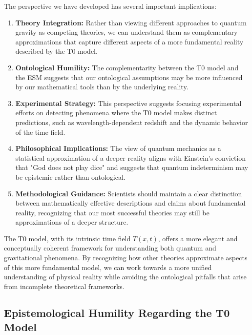 \documentclass[12pt,a4paper]{article}
\newcommand{\Tfieldt}{T(x,t)}
\begin{document}
	The perspective we have developed has several important implications:
	
	\begin{enumerate}
		\item \textbf{Theory Integration:} Rather than viewing different approaches to quantum gravity as competing theories, we can understand them as complementary approximations that capture different aspects of a more fundamental reality described by the T0 model.
		
		\item \textbf{Ontological Humility:} The complementarity between the T0 model and the ESM suggests that our ontological assumptions may be more influenced by our mathematical tools than by the underlying reality.
		
		\item \textbf{Experimental Strategy:} This perspective suggests focusing experimental efforts on detecting phenomena where the T0 model makes distinct predictions, such as wavelength-dependent redshift and the dynamic behavior of the time field.
		
		\item \textbf{Philosophical Implications:} The view of quantum mechanics as a statistical approximation of a deeper reality aligns with Einstein's conviction that "God does not play dice" and suggests that quantum indeterminism may be epistemic rather than ontological.
		
		\item \textbf{Methodological Guidance:} Scientists should maintain a clear distinction between mathematically effective descriptions and claims about fundamental reality, recognizing that our most successful theories may still be approximations of a deeper structure.
	\end{enumerate}
	
	The T0 model, with its intrinsic time field $\Tfieldt$, offers a more elegant and conceptually coherent framework for understanding both quantum and gravitational phenomena. By recognizing how other theories approximate aspects of this more fundamental model, we can work towards a more unified understanding of physical reality while avoiding the ontological pitfalls that arise from incomplete theoretical frameworks.
	
	\subsection{Epistemological Humility Regarding the T0 Model}
	\label{subsec:t0_humility}
	
\end{document}

